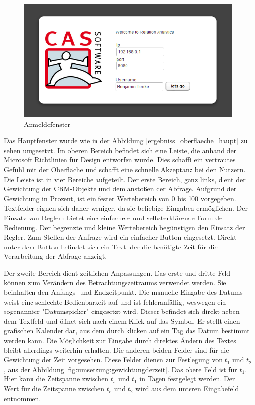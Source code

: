 \begin{figure}[htbp]
\centering
\includegraphics[scale=2.0]{pics/login.png}
\caption{Anmeldefenster}
\label{ergebniss_oberflaeche_anmeld}
\end{figure}

Das Hauptfenster wurde wie in der Abbildung \ref{ergebniss_oberflaeche_haupt} zu sehen umgesetzt. Im oberen Bereich befindet sich eine Leiste, die anhand der Microsoft Richtlinien für Design entworfen wurde. Dies schafft ein vertrautes Gefühl mit der Oberfläche und schafft eine schnelle Akzeptanz bei den Nutzern. Die Leiste ist in vier Bereiche aufgeteilt. Der erste Bereich, ganz links, dient der Gewichtung der CRM-Objekte und dem anstoßen der Abfrage. Aufgrund der Gewichtung in Prozent, ist ein fester Wertebereich von 0 bis 100 vorgegeben. Textfelder eignen sich daher weniger, da sie beliebige Eingaben ermöglichen. Der Einsatz von Reglern bietet eine einfachere und selbsterklärende Form der Bedienung. Der begrenzte und kleine Wertebereich begünstigen den Einsatz der Regler. Zum Stellen der Anfrage wird ein einfacher Button eingesetzt. Direkt unter dem Button befindet sich ein Text, der die benötigte Zeit für die Verarbeitung der Abfrage anzeigt. 

Der zweite Bereich dient zeitlichen Anpassungen. Das erste und dritte Feld können zum Verändern des Betrachtungszeitraums verwendet werden. Sie beinhalten den Anfangs- und Endzeitpunkt. Die manuelle Eingabe des Datums weist eine schlechte Bedienbarkeit auf und ist fehleranfällig, weswegen ein sogenannter "Datumspicker" eingesetzt wird. Dieser befindet sich direkt neben dem Textfeld und öffnet sich nach einem Klick auf das Symbol. Er stellt einen grafischen Kalender dar, aus dem durch klicken auf ein Tag das Datum bestimmt werden kann. Die Möglichkeit zur Eingabe durch direktes Ändern des Textes bleibt allerdings weiterhin erhalten. Die anderen beiden Felder sind für die Gewichtung der Zeit vorgesehen. Diese Felder dienen zur Festlegung von $t_1$ und $t_2$, aus der Abbildung \ref{fig:umsetzung:gewichtungderzeit}. Das obere Feld ist für $t_1$. Hier kann die Zeitspanne zwischen $t_{s}$ und $t_1$ in Tagen festgelegt werden. Der Wert für die Zeitspanne zwischen $t_{e}$ und $t_2$ wird aus dem unteren Eingabefeld entnommen.


